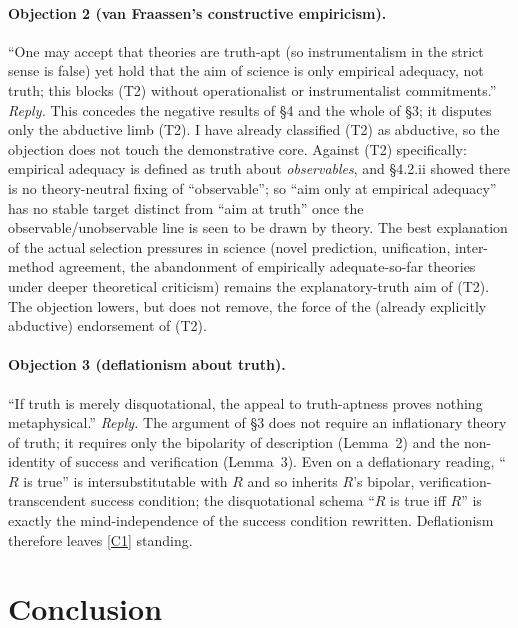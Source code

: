 \documentclass[12pt]{article}
\begin{document}
\paragraph{Objection 2 (van Fraassen's constructive empiricism).} ``One
may accept that theories are truth-apt (so instrumentalism in the strict
sense is false) yet hold that the aim of science is only empirical
adequacy, not truth; this blocks (T2) without operationalist or
instrumentalist commitments.'' \emph{Reply.} This concedes the negative
results of \S4 and the whole of \S3; it disputes only the abductive limb
(T2). I have already classified (T2) as abductive, so the objection does
not touch the demonstrative core. Against (T2) specifically: empirical
adequacy is defined as truth about \emph{observables}, and \S4.2.ii
showed there is no theory-neutral fixing of ``observable''; so ``aim only
at empirical adequacy'' has no stable target distinct from ``aim at
truth'' once the observable/unobservable line is seen to be drawn by
theory. The best explanation of the actual selection pressures in science
(novel prediction, unification, inter-method agreement, the abandonment
of empirically adequate-so-far theories under deeper theoretical
criticism) remains the explanatory-truth aim of (T2). The objection
lowers, but does not remove, the force of the (already explicitly
abductive) endorsement of (T2).

\paragraph{Objection 3 (deflationism about truth).} ``If truth is merely
disquotational, the appeal to truth-aptness proves nothing
metaphysical.'' \emph{Reply.} The argument of \S3 does not require an
inflationary theory of truth; it requires only the bipolarity of
description (Lemma~2) and the non-identity of success and verification
(Lemma~3). Even on a deflationary reading, ``$R$ is true'' is
intersubstitutable with $R$ and so inherits $R$'s bipolar,
verification-transcendent success condition; the disquotational schema
``$R$ is true iff $R$'' is exactly the mind-independence of the success
condition rewritten. Deflationism therefore leaves \ref{C1} standing.

\section{Conclusion}
\end{document}
